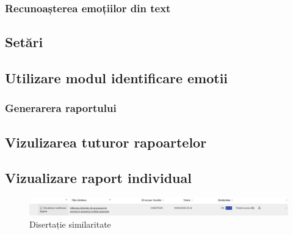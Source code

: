 \documentclass[a4paper, 12pt]{report}
\begin{document}
	\clearpage
	\subsubsection{Recunoașterea emoțiilor din text}
	
	\clearpage
	\subsection{Setări}
	
	\clearpage
	\subsection{Utilizare modul identificare emotii}
	
	\clearpage
	\subsubsection{Generarera raportului}
	
	\clearpage
	\subsection{Vizulizarea tuturor rapoartelor}
	
	\clearpage
	\subsection{Vizualizare raport individual}
	
	
	\clearpage
    \printbibliography
    \clearpage
	\begin{figure}[H]
		\begin{center}
			\includegraphics[scale=0.4]{images/plagiat.PNG}
		\end{center}
		\caption{Disertație similaritate }
		\label{fig:sim}
	\end{figure} 	
\end{document}
